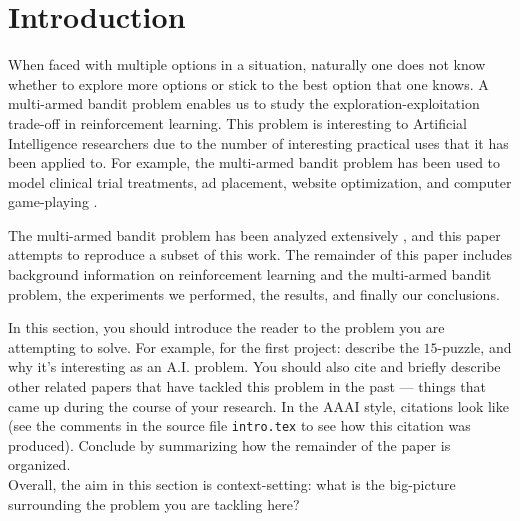 
\section{Introduction}
\label{sec:intro}

When faced with multiple options in a situation, naturally one does
not know whether to explore more options or stick to the best option
that one knows. A multi-armed bandit problem enables us to study the
exploration-exploitation trade-off in reinforcement learning. This
problem is interesting to Artificial Intelligence researchers due to
the number of interesting practical uses that it has been applied
to. For example, the multi-armed bandit problem has been used to model
clinical trial treatments, ad placement, website optimization, and 
computer game-playing \cite{bubeck}.

The multi-armed bandit problem has been analyzed extensively
\cite{auer}, and this paper attempts to reproduce a subset of this
work. The remainder of this paper includes background information on
reinforcement learning and the multi-armed bandit problem, the
experiments we performed, the results, and finally our conclusions.


In this section, you should introduce the reader to the problem you
are attempting to solve. For example, for the first project: describe
the $15$-puzzle, and why it's interesting as an A.I. problem. You
should also cite and briefly describe other related papers that have
tackled this problem in the past --- things that came up during the
course of your research. In the AAAI style, citations look like
\cite{aima} (see the comments in the source file \texttt{intro.tex} to
see how this citation was produced). Conclude by summarizing how the
remainder of the paper is organized.\\


Overall, the aim in this section is context-setting: what is the
big-picture surrounding the problem you are tackling here?

